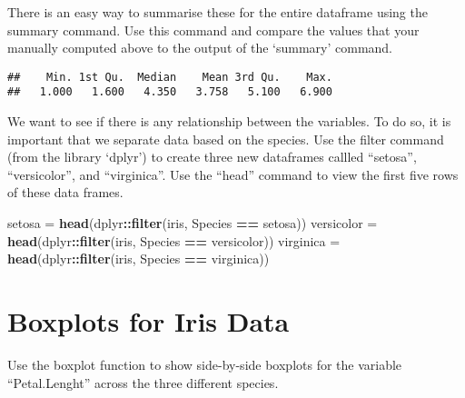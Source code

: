 \documentclass[
]{article}
\newenvironment{Shaded}{\begin{snugshade}}{\end{snugshade}}
\newcommand{\FunctionTok}[1]{\textcolor[rgb]{0.13,0.29,0.53}{\textbf{#1}}}
\newcommand{\NormalTok}[1]{#1}
\newcommand{\OtherTok}[1]{\textcolor[rgb]{0.56,0.35,0.01}{#1}}
\newcommand{\SpecialCharTok}[1]{\textcolor[rgb]{0.81,0.36,0.00}{\textbf{#1}}}
\newcommand{\StringTok}[1]{\textcolor[rgb]{0.31,0.60,0.02}{#1}}
\begin{document}
There is an easy way to summarise these for the entire dataframe using
the summary command. Use this command and compare the values that your
manually computed above to the output of the `summary' command.

\begin{Shaded}
\end{Shaded}

\begin{verbatim}
##    Min. 1st Qu.  Median    Mean 3rd Qu.    Max. 
##   1.000   1.600   4.350   3.758   5.100   6.900
\end{verbatim}

We want to see if there is any relationship between the variables. To do
so, it is important that we separate data based on the species. Use the
filter command (from the library `dplyr') to create three new dataframes
callled ``setosa'', ``versicolor'', and ``virginica''. Use the ``head''
command to view the first five rows of these data frames.

\begin{Shaded}
\begin{Highlighting}[]
\NormalTok{  setosa }\OtherTok{=} \FunctionTok{head}\NormalTok{(dplyr}\SpecialCharTok{::}\FunctionTok{filter}\NormalTok{(iris, Species }\SpecialCharTok{==} \StringTok{\textquotesingle{}setosa\textquotesingle{}}\NormalTok{))}
\NormalTok{  versicolor }\OtherTok{=} \FunctionTok{head}\NormalTok{(dplyr}\SpecialCharTok{::}\FunctionTok{filter}\NormalTok{(iris, Species }\SpecialCharTok{==} \StringTok{\textquotesingle{}versicolor\textquotesingle{}}\NormalTok{))}
\NormalTok{  virginica }\OtherTok{=} \FunctionTok{head}\NormalTok{(dplyr}\SpecialCharTok{::}\FunctionTok{filter}\NormalTok{(iris, Species }\SpecialCharTok{==} \StringTok{\textquotesingle{}virginica\textquotesingle{}}\NormalTok{))}
\end{Highlighting}
\end{Shaded}

\hypertarget{boxplots-for-iris-data}{%
\section{Boxplots for Iris Data}\label{boxplots-for-iris-data}}

Use the boxplot function to show side-by-side boxplots for the variable
``Petal.Lenght'' across the three different species.
\end{document}
